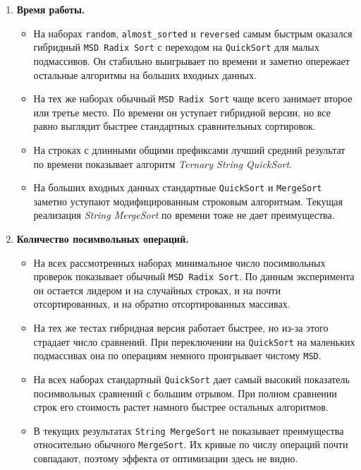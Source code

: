 \documentclass[12pt,a4paper]{article}
\begin{document}
\begin{enumerate}[leftmargin=1.6em]
    \item \textbf{Время работы.}
    \begin{itemize}[leftmargin=1.4em]
        \item На наборах \texttt{random}, \texttt{almost\_sorted} и \texttt{reversed} самым быстрым оказался гибридный \texttt{MSD Radix Sort} с переходом на \texttt{QuickSort} для малых подмассивов. Он стабильно выигрывает по времени и заметно опережает остальные алгоритмы на больших входных данных.
        \item На тех же наборах обычный \texttt{MSD Radix Sort} чаще всего занимает второе или третье место. По времени он уступает гибридной версии, но все равно выглядит быстрее стандартных сравнительных сортировок.
        \item На строках с длинными общими префиксами лучший средний результат по времени показывает алгоритм \textit{Ternary String QuickSort}. 
        \item На больших входных данных стандартные \texttt{QuickSort} и \texttt{MergeSort} заметно уступают модифицированным строковым алгоритмам. Текущая реализация \textit{String MergeSort} по времени тоже не дает преимущества.
    \end{itemize}

    \item \textbf{Количество посимвольных операций.}
    \begin{itemize}[leftmargin=1.4em]
        \item На всех рассмотренных наборах минимальное число посимвольных проверок показывает обычный \texttt{MSD Radix Sort}. По данным эксперимента он остается лидером и на случайных строках, и на почти отсортированных, и на обратно отсортированных массивах.
        \item На тех же тестах гибридная версия работает быстрее, но из-за этого страдает число сравнений. При переключении на \texttt{QuickSort} на маленьких подмассивах она по операциям немного проигрывает чистому \texttt{MSD}.
        \item На всех наборах стандартный \texttt{QuickSort} дает самый высокий показатель посимвольных сравнений с большим отрывом. При полном сравнении строк его стоимость растет намного быстрее остальных алгоритмов.
        \item В текущих результатах \texttt{String MergeSort} не показывает преимущества относительно обычного \texttt{MergeSort}. Их кривые по числу операций почти совпадают, поэтому эффекта от оптимизации здесь не видно.
    \end{itemize}
\end{enumerate}
\end{document}
